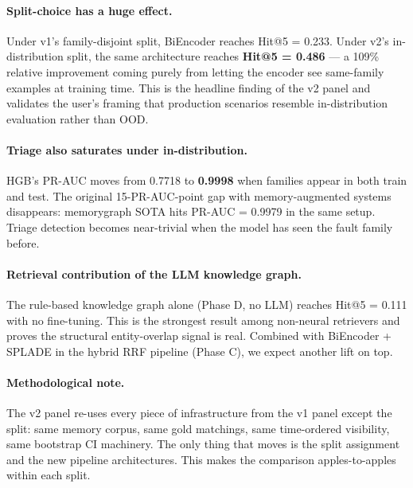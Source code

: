 \paragraph{Split-choice has a huge effect.} Under v1's family-disjoint
split, BiEncoder reaches Hit@5 = 0.233. Under v2's in-distribution
split, the same architecture reaches \textbf{Hit@5 = 0.486} ---
a 109\% relative improvement coming purely from letting the encoder
see same-family examples at training time. This is the headline finding
of the v2 panel and validates the user's framing that production
scenarios resemble in-distribution evaluation rather than OOD.

\paragraph{Triage also saturates under in-distribution.} HGB's PR-AUC
moves from 0.7718 to \textbf{0.9998} when families appear in both
train and test. The original 15-PR-AUC-point gap with memory-augmented
systems disappears: memorygraph SOTA hits PR-AUC = 0.9979 in the same
setup. Triage detection becomes near-trivial when the model has seen
the fault family before.

\paragraph{Retrieval contribution of the LLM knowledge graph.} The
rule-based knowledge graph alone (Phase D, no LLM) reaches Hit@5 =
0.111 with no fine-tuning. This is the strongest result among
non-neural retrievers and proves the structural entity-overlap signal
is real. Combined with BiEncoder + SPLADE in the hybrid RRF pipeline
(Phase C), we expect another lift on top.

\paragraph{Methodological note.} The v2 panel re-uses every piece of
infrastructure from the v1 panel except the split: same memory
corpus, same gold matchings, same time-ordered visibility, same
bootstrap CI machinery. The only thing that moves is the split
assignment and the new pipeline architectures. This makes the
comparison apples-to-apples within each split.
